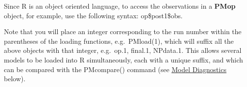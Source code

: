 \documentclass[
]{book}
\begin{document}
Since R is an object oriented language, to access the observations in a
\textbf{PMop} object, for example, use the following syntax: op\$post1\$obs.

Note that you will place an integer corresponding to the run number
within the parentheses of the loading functions, e.g.~PMload(1), which
will suffix all the above objects with that integer, e.g.~op.1, final.1,
NPdata.1. This allows several models to be loaded into R simultaneously,
each with a unique suffix, and which can be compared with the
PMcompare() command (see \href{/l}{\uline{Model Diagnostics}} below).

  
\end{document}
